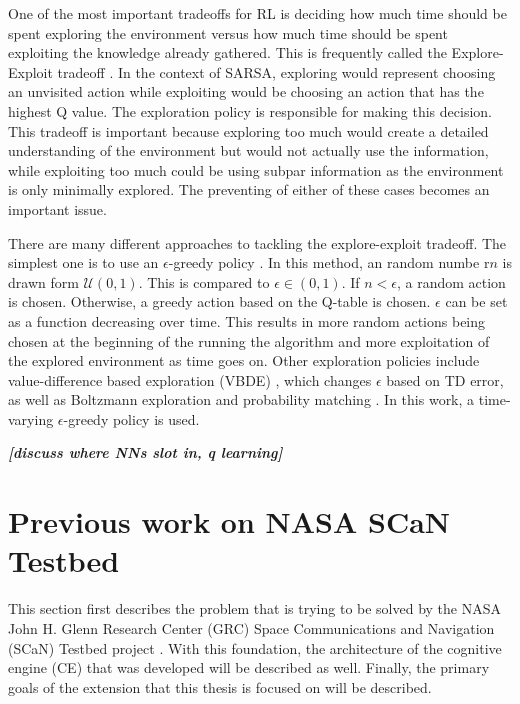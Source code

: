 	\par One of the most important tradeoffs for RL is deciding how much time should be spent exploring the environment versus how much time should be spent exploiting the knowledge already gathered. This is frequently called the Explore-Exploit tradeoff \cite{placeholderCitation}. In the context of SARSA, exploring would represent choosing an unvisited action while exploiting would be choosing an action that has the highest Q value. The exploration policy is responsible for making this decision. This tradeoff is important because exploring too much would create a detailed understanding of the environment but would not actually use the information, while exploiting too much could be using subpar information as the environment is only minimally explored. The preventing of either of these cases becomes an important issue. 
	\par There are many different approaches to tackling the explore-exploit tradeoff. The simplest one is to use an $\epsilon$-greedy policy \cite{placeholderCitation}. In this method, an  random numbe r$n$ is drawn form $\mathcal{U}(0,1)$. This is compared to $\epsilon \in (0,1)$. If $n<\epsilon$, a random action is chosen. Otherwise, a greedy action based on the Q-table is chosen\cite{placeholderCitation}. $\epsilon$ can be set as a function decreasing over time. This results in more random actions being chosen at the beginning of the running the algorithm and more exploitation of the explored environment as time goes on. Other exploration policies include value-difference based exploration (VBDE) \cite{placeholderCitation}, which changes $\epsilon$ based on TD error, as well as Boltzmann exploration and probability matching \cite{placeholderCitation}. In this work, a time-varying $\epsilon$-greedy policy is used. 
	\par \textit{\textbf{[discuss where NNs slot in, q learning]}}
	\section{Previous work on NASA SCaN Testbed}
	\par This section first describes the problem that is trying to be solved by the NASA John H. Glenn Research Center (GRC) Space Communications and Navigation (SCaN) Testbed project \cite{placeholderCitation}. With this foundation, the architecture of the cognitive engine (CE) that was developed will be described as well. Finally, the primary goals of the extension that this thesis is focused on will be described.
